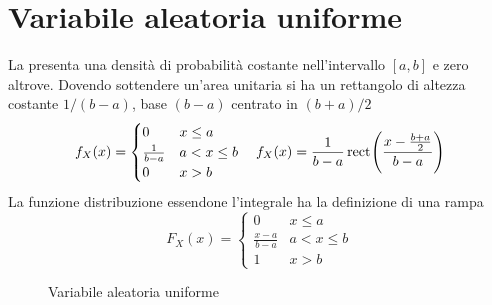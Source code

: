 \section{Variabile aleatoria uniforme}
La  presenta una densità di probabilità costante nell'intervallo $[a,b]$ e zero altrove. Dovendo sottendere un'area unitaria si ha un rettangolo di altezza costante $1/(b-a)$, base $(b-a)$ centrato in $(b+a)/2$
\begin{equation}f_X(x)=\begin{cases}0&x\leq a\\ \frac{1}{b-a}&a<x\leq b\\0&x>b\end{cases}\quad f_X(x)=\frac{1}{b-a}\,{\operatorname{rect}}^{}\!\left({\frac{x-\frac{b+a}{2}}{b-a}}\right)\end{equation}
La funzione distribuzione essendone l'integrale ha la definizione di una rampa
\begin{equation}F_X(x)=\begin{cases}
0&x\leq a\\ \frac{x-a}{b-a}&a<x\leq b\\1&x>b
\end{cases}\end{equation}
\begin{figure}[!ht]
	\centering
	\qquad
	\caption{Variabile aleatoria uniforme}
\end{figure}

